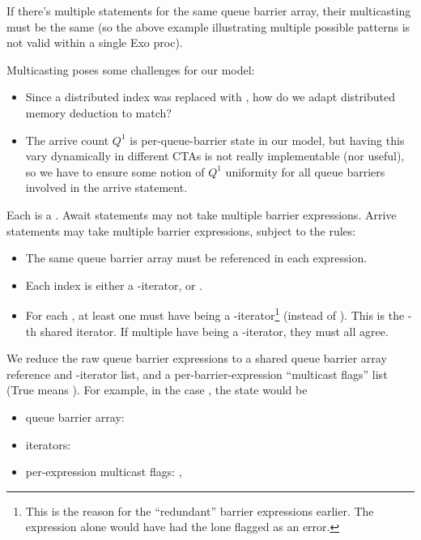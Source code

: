 \filbreak
If there's multiple  statements for the same queue barrier array, their multicasting must be the same (so the above example illustrating multiple possible patterns is not valid within a single Exo proc).

Multicasting poses some challenges for our model:
\begin{itemize}
\item Since a distributed index was replaced with \lighttt{:}, how do we adapt distributed memory deduction to match?
\filbreak
\item The arrive count $Q^1$ is per-queue-barrier state in our model, but having this vary dynamically in different CTAs is not really implementable (nor useful), so we have to ensure some notion of $Q^1$ uniformity for all queue barriers involved in the arrive statement.
\end{itemize}

\filbreak
{}

Each  is a .
Await statements may not take multiple barrier expressions.
Arrive statements may take multiple barrier expressions, subject to the rules:
\begin{itemize}
  \item The same queue barrier array must be referenced in each expression.
  \filbreak
  \item Each index is either a -iterator, or \lighttt{:}.
  \filbreak
  \item For each , at least one  must have  being a -iterator\footnote{This is the reason for the ``redundant'' barrier expressions earlier. The expression  alone would have had the lone \lighttt{:} flagged as an error.} (instead of \lighttt{:}).
    This is the -th shared  iterator.
    If multiple  have  being a -iterator, they must all agree.
\end{itemize}

\filbreak
We reduce the raw queue barrier expressions to a shared queue barrier array reference and -iterator list, and a per-barrier-expression ``multicast flags'' list (True means \lighttt{:}).
For example, in the case , the state would be
\begin{itemize}
  \item queue barrier array: 
  \filbreak
  \item iterators: 
  \filbreak
  \item per-expression multicast flags: , 
\end{itemize}

